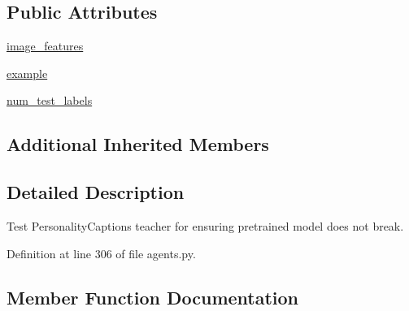 \subsection*{Public Attributes}
\begin{DoxyCompactItemize}
\item 
\hyperlink{classparlai_1_1tasks_1_1personality__captions_1_1agents_1_1PersonalityCaptionsTestTeacher_a3b99c22797205aaf11f652bd28c314c3}{image\+\_\+features}
\item 
\hyperlink{classparlai_1_1tasks_1_1personality__captions_1_1agents_1_1PersonalityCaptionsTestTeacher_a183b3779c4ce45111f608a263e8147a5}{example}
\item 
\hyperlink{classparlai_1_1tasks_1_1personality__captions_1_1agents_1_1PersonalityCaptionsTestTeacher_aa2232ceb48d0dd2f67e8f15ac0a549e0}{num\+\_\+test\+\_\+labels}
\end{DoxyCompactItemize}
\subsection*{Additional Inherited Members}


\subsection{Detailed Description}
\begin{DoxyVerb}Test PersonalityCaptions teacher for ensuring pretrained model does not break.
\end{DoxyVerb}
 

Definition at line 306 of file agents.\+py.



\subsection{Member Function Documentation}
\mbox{\label{classparlai_1_1tasks_1_1personality__captions_1_1agents_1_1PersonalityCaptionsTestTeacher_a07f538c8c1ff16a9d08b78d1ea3ef1f8}} 
